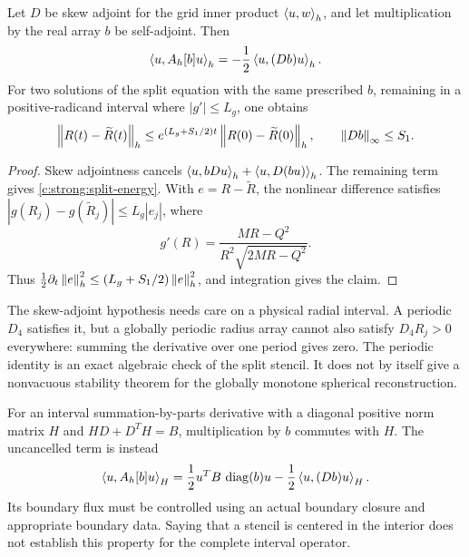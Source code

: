 \begin{proposition}
Let $D$ be skew adjoint for the grid inner product $\left\langle u,w\right\rangle_h$, and let multiplication by the real array $b$ be self-adjoint. Then
\begin{equation}
 \left\langle u,A_h[b]u\right\rangle_h
       =-\frac12\left\langle u,(Db)u\right\rangle_h.
\label{c:strong:split-energy}
\end{equation}
For two solutions of the split equation with the same prescribed $b$, remaining in a positive-radicand interval where $|g'|\le L_g$, one obtains
\begin{equation}
 \left\lVert R(t)-\widetilde R(t)\right\rVert_h
 \le e^{(L_g+S_1/2)t}\left\lVert R(0)-\widetilde R(0)\right\rVert_h,
 \qquad \left\lVert Db\right\rVert_\infty\le S_1.
\label{c:strong:semidiscrete-bound}
\end{equation}
\end{proposition}
\begin{proof}
Skew adjointness cancels $\left\langle u,bDu\right\rangle_h+\left\langle u,D(bu)\right\rangle_h$. The remaining term gives \eqref{c:strong:split-energy}. With $e=R-\widetilde R$, the nonlinear difference satisfies
$|g(R_j)-g(\widetilde R_j)|\le L_g|e_j|$, where
\begin{equation}
 g'(R)=\frac{MR-Q^2}{R^2\sqrt{2MR-Q^2}}.
\end{equation}
Thus $\tfrac12\partial_t\left\lVert e\right\rVert_h^2\le(L_g+S_1/2)\left\lVert e\right\rVert_h^2$, and integration gives the claim.
\end{proof}

The skew-adjoint hypothesis needs care on a physical radial interval. A periodic $D_4$ satisfies it, but a globally periodic radius array cannot also satisfy $D_4R_j>0$ everywhere: summing the derivative over one period gives zero. The periodic identity is an exact algebraic check of the split stencil. It does not by itself give a nonvacuous stability theorem for the globally monotone spherical reconstruction.

For an interval summation-by-parts derivative with a diagonal positive norm matrix $H$ and $HD+D^TH=B$, multiplication by $b$ commutes with $H$. The uncancelled term is instead
\begin{equation}
 \left\langle u,A_h[b]u\right\rangle_H
 =\frac12u^TB\,\operatorname{diag}(b)u
  -\frac12\left\langle u,(Db)u\right\rangle_H.
\end{equation}
Its boundary flux must be controlled using an actual boundary closure and appropriate boundary data. Saying that a stencil is centered in the interior does not establish this property for the complete interval operator.

